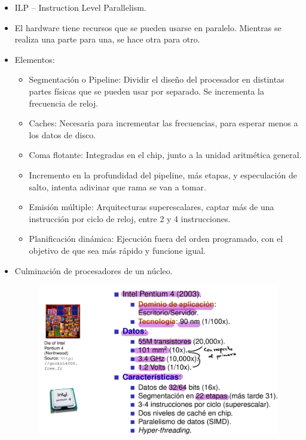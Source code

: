 \documentclass[12pt, twoside, openright]{report} %
\begin{document}
    \begin{itemize}
    \item
      ILP -- Instruction Level Parallelism.
    \item
      El hardware tiene recursos que se pueden usarse en paralelo.
      Mientras se realiza una parte para una, se hace otra para otro.
    \item
      Elementos:

      \begin{itemize}
      
      \item
        Segmentación o Pipeline: Dividir el diseño del procesador en
        distintas partes físicas que se pueden usar por separado. Se
        incrementa la frecuencia de reloj.
      \item
        Caches: Necesaria para incrementar las frecuencias, para esperar
        menos a los datos de disco.
      \item
        Coma flotante: Integradas en el chip, junto a la unidad
        aritmética general.
      \item
        Incremento en la profundidad del pipeline, más etapas, y
        especulación de salto, intenta adivinar que rama se van a tomar.
      \item
        Emisión múltiple: Arquitecturas superescalares, captar más de
        una instrucción por ciclo de reloj, entre 2 y 4 instrucciones.
      \item
        Planificación dinámica: Ejecución fuera del orden programado,
        con el objetivo de que sea más rápido y funcione igual.
      \end{itemize}
    \item
      Culminación de procesadores de un núcleo.
      \begin{figure}[H]
        {\includegraphics[scale=.25]{Untitled 3.png}}
      \end{figure}
    \end{itemize}
    
\end{document}
